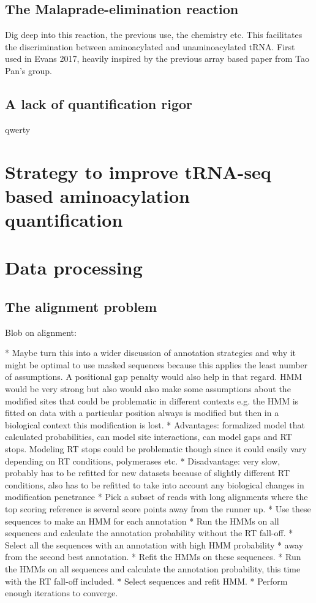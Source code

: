 \subsection{The Malaprade-elimination reaction}
Dig deep into this reaction, the previous use, the chemistry etc.
This facilitates the discrimination between aminoacylated and unaminoacylated tRNA.
First used in Evans 2017, heavily inspired by the previous array based paper from Tao Pan's group.


\subsection{A lack of quantification rigor}
qwerty




\section{Strategy to improve tRNA-seq based aminoacylation quantification}


\section{Data processing}

\subsection{The alignment problem}
Blob on alignment:

* Maybe turn this into a wider discussion of annotation strategies and why it might be optimal to use masked sequences because this applies the least number of assumptions. A positional gap penalty would also help in that regard. HMM would be very strong but also would also make some assumptions about the modified sites that could be problematic in different contexts e.g. the HMM is fitted on data with a particular position always is modified but then in a biological context this modification is lost.
* Advantages: formalized model that calculated probabilities, can model site interactions, can model gaps and RT stops.
Modeling RT stops could be problematic though since it could easily vary depending on RT conditions, polymerases etc.
* Disadvantage: very slow, probably has to be refitted for new datasets because of slightly different RT conditions, also has to be refitted to take into account any biological changes in modification penetrance
* Pick a subset of reads with long alignments where the top scoring reference is several score points away from the runner up.
* Use these sequences to make an HMM for each annotation
* Run the HMMs on all sequences and calculate the annotation probability without the RT fall-off.
* Select all the sequences with an annotation with high HMM probability * away from the second best annotation.
* Refit the HMMs on these sequences.
* Run the HMMs on all sequences and calculate the annotation probability, this time with the RT fall-off included.
* Select sequences and refit HMM.
* Perform enough iterations to converge.





